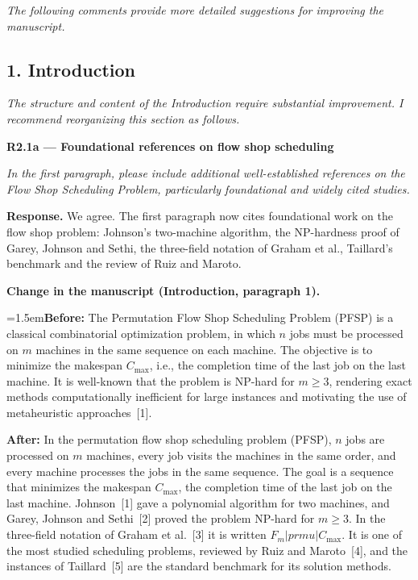 \documentclass[12pt]{article}
\newenvironment{rc}[1]{\par\medskip\noindent\textbf{#1}\par\nopagebreak\noindent\itshape\renewcommand{\emph}[1]{\textbf{##1}}\ignorespaces}{\par}
\newenvironment{lead}{\par\medskip\noindent\itshape\renewcommand{\emph}[1]{\textbf{##1}}\ignorespaces}{\par}
\newcommand{\answer}[1]{\par\smallskip\noindent\textbf{Response.} #1\par}
\newcommand{\change}[3]{\par\smallskip\noindent\textbf{Change in the manuscript (#1).}\par
  {\leftskip=1.5em\noindent\textbf{Before:} #2\par\noindent\textbf{After:} #3\par}}
\begin{document}
\begin{lead}
The following comments provide more detailed suggestions for improving the manuscript.
\end{lead}

\subsection*{1. Introduction}

\begin{lead}
The structure and content of the Introduction require substantial improvement. I recommend reorganizing this section as follows.
\end{lead}

\begin{rc}{R2.1a --- Foundational references on flow shop scheduling}
In the first paragraph, please include additional well-established references on the Flow Shop Scheduling Problem, particularly foundational and widely cited studies.
\end{rc}
\answer{We agree. The first paragraph now cites foundational work on the flow shop problem: Johnson's two-machine algorithm, the NP-hardness proof of Garey, Johnson and Sethi, the three-field notation of Graham et al., Taillard's benchmark and the review of Ruiz and Maroto.}
\change{Introduction, paragraph 1}{The Permutation Flow Shop Scheduling Problem (PFSP) is a classical combinatorial optimization problem, in which $n$ jobs must be processed on $m$ machines in the same sequence on each machine. The objective is to minimize the makespan $C_{\max}$, i.e., the completion time of the last job on the last machine. It is well-known that the problem is NP-hard for $m \ge 3$, rendering exact methods computationally inefficient for large instances and motivating the use of metaheuristic approaches~[1].}{In the permutation flow shop scheduling problem (PFSP), $n$ jobs are processed on $m$ machines, every job visits the machines in the same order, and every machine processes the jobs in the same sequence. The goal is a sequence that minimizes the makespan $C_{\max}$, the completion time of the last job on the last machine. Johnson~[1] gave a polynomial algorithm for two machines, and Garey, Johnson and Sethi~[2] proved the problem NP-hard for $m\ge 3$. In the three-field notation of Graham et al.~[3] it is written $F_m|prmu|C_{\max}$. It is one of the most studied scheduling problems, reviewed by Ruiz and Maroto~[4], and the instances of Taillard~[5] are the standard benchmark for its solution methods.}
\end{document}
